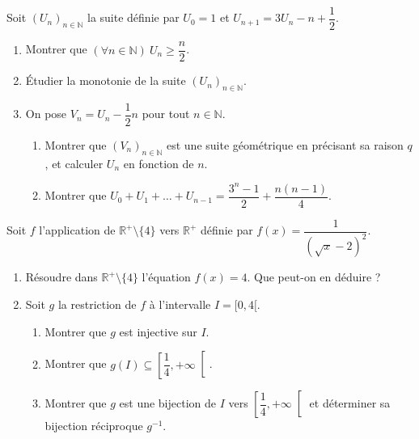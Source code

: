 Soit $(U_n)_{n\in\mathbb{N}}$ la suite définie par $U_0=1$ et $U_{n+1}=3U_n-n+\dfrac12$.
\begin{enumerate}
\item Montrer que $(\forall n\in\mathbb{N})\ U_n\geq\dfrac n2$.
\item Étudier la monotonie de la suite $(U_n)_{n\in\mathbb{N}}$.
\item On pose $V_n=U_n-\dfrac12n$ pour tout $n\in\mathbb{N}$.
\begin{enumerate}
\item Montrer que $(V_n)_{n\in\mathbb{N}}$ est une suite géométrique en précisant sa raison $q$, et calculer $U_n$ en fonction de $n$.
\item Montrer que $U_0+U_1+\dots+U_{n-1}=\dfrac{3^n-1}{2}+\dfrac{n(n-1)}{4}$.
\end{enumerate}
\end{enumerate}
\fin
{}
Soit $f$ l'application de $\mathbb{R}^+\setminus\{4\}$ vers $\mathbb{R}^+$ définie par $f(x)=\dfrac{1}{\left(\sqrt x-2\right)^2}$.
\begin{enumerate}
\item Résoudre dans $\mathbb{R}^+\setminus\{4\}$ l'équation $f(x)=4$. Que peut-on en déduire ?
\item Soit $g$ la restriction de $f$ à l'intervalle $I=[0,4[$.
\begin{enumerate}
\item Montrer que $g$ est injective sur $I$.
\item Montrer que $g(I)\subseteq\left[\dfrac14,+\infty\right[$.
\item Montrer que $g$ est une bijection de $I$ vers $\left[\dfrac14,+\infty\right[$ et déterminer sa bijection réciproque $g^{-1}$.
\end{enumerate}
\end{enumerate}
\fin

